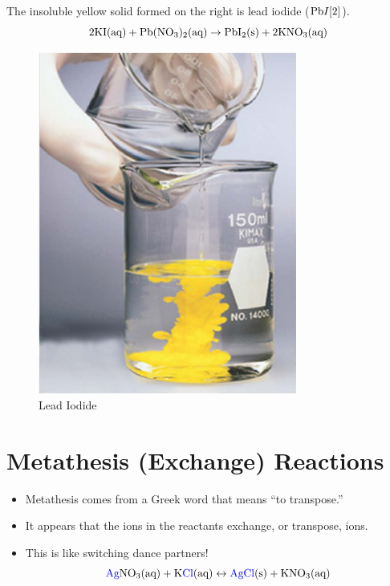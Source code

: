 \documentclass[
	chapter=4
]{chem122notes}
\begin{document}
\begin{minipage}[m]{0.6\textwidth}
	The insoluble yellow solid formed on the right is lead iodide ($\element{Pb}{I}[2]$).
	\[ 2\element{K}\element{I} (\mbox{aq}) + \element{Pb}(\element{N}\element{O}_{3})_{2} (\mbox{aq}) \rightarrow \element{Pb}\element{I}_{2} (\mbox{s}) + 2\element{K}\element{N}\element{O}[3] (\mbox{aq}) \]
\end{minipage}\hfill%
\begin{minipage}[t]{0.4\textwidth}
	\begin{figure}[H]
		\centering
		\includegraphics[width=\textwidth]{chapter4/lead_iodide}
		\caption{Lead Iodide}
		\label{fig:lead-iodide}
	\end{figure}
\end{minipage}

\section{Metathesis (Exchange) Reactions}\label{sec:metathesis-(exchange)-reactions}
\begin{itemize}
	\item Metathesis comes from a Greek word that means ``to transpose.''
	\item It appears that the ions in the reactants exchange, or transpose, ions.
	\item This is like switching dance partners!
	\[ \textcolor{blue}{\element{Ag}}\element{N}\element{O}[3] (\mbox{aq}) + \element{K}\textcolor{blue}{\element{Cl}} (\mbox{aq}) \leftrightarrow \textcolor{blue}{\element{Ag}\element{Cl}} (\mbox{s}) + \element{K}\element{N}\element{O}[3] (\mbox{aq}) \]
\end{itemize}
\end{document}
